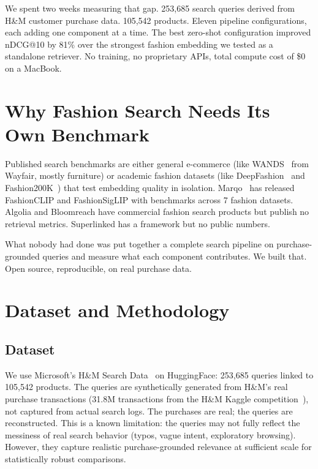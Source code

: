 \documentclass[11pt,a4paper]{article}
\begin{document}
We spent two weeks measuring that gap. 253,685 search queries derived from H\&M customer purchase data. 105,542 products. Eleven pipeline configurations, each adding one component at a time. The best zero-shot configuration improved nDCG@10 by 81\% over the strongest fashion embedding we tested as a standalone retriever. No training, no proprietary APIs, total compute cost of \$0 on a MacBook.

\section{Why Fashion Search Needs Its Own Benchmark}

Published search benchmarks are either general e-commerce (like WANDS~\cite{wands} from Wayfair, mostly furniture) or academic fashion datasets (like DeepFashion~\cite{deepfashion} and Fashion200K~\cite{fashion200k}) that test embedding quality in isolation. Marqo~\cite{marqo-fashionclip} has released FashionCLIP and FashionSigLIP with benchmarks across 7 fashion datasets. Algolia and Bloomreach have commercial fashion search products but publish no retrieval metrics. Superlinked has a framework but no public numbers.

What nobody had done was put together a complete search pipeline on purchase-grounded queries and measure what each component contributes. We built that. Open source, reproducible, on real purchase data.

\section{Dataset and Methodology}

\subsection{Dataset}

We use Microsoft's H\&M Search Data~\cite{hnm-search-data} on HuggingFace: 253,685 queries linked to 105,542 products. The queries are synthetically generated from H\&M's real purchase transactions (31.8M transactions from the H\&M Kaggle competition~\cite{hnm-kaggle}), not captured from actual search logs. The purchases are real; the queries are reconstructed. This is a known limitation: the queries may not fully reflect the messiness of real search behavior (typos, vague intent, exploratory browsing). However, they capture realistic purchase-grounded relevance at sufficient scale for statistically robust comparisons.
\end{document}
